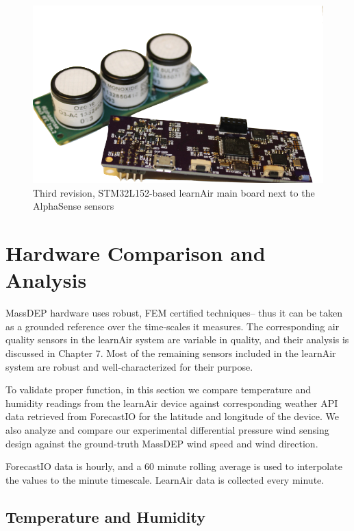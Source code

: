 \begin{figure}
 	\includegraphics[width=\textwidth]{visuals/learnairV3} \centering              
 	 \caption{Third revision, STM32L152-based learnAir main board next to the AlphaSense sensors}
  	\label{fig:learnairV3}
\end{figure}

\clearpage

\FloatBarrier
\section{Hardware Comparison and Analysis}
\FloatBarrier

MassDEP hardware uses robust, FEM certified techniques-- thus it can be taken as a grounded reference over the time-scales it measures.  The corresponding air quality sensors in the learnAir system are variable in quality, and their analysis is discussed in Chapter 7.    Most of the remaining sensors included in the learnAir system are robust and well-characterized for their purpose.

To validate proper function, in this section we compare temperature and humidity readings from the learnAir device against corresponding weather API data retrieved from ForecastIO for the latitude and longitude of the device.  We also analyze and compare our experimental differential pressure wind sensing design against the ground-truth MassDEP wind speed and wind direction.

ForecastIO data is hourly, and a 60 minute rolling average is used to interpolate the values to the minute timescale.  LearnAir data is collected every minute.

\subsection{Temperature and Humidity}
\FloatBarrier

